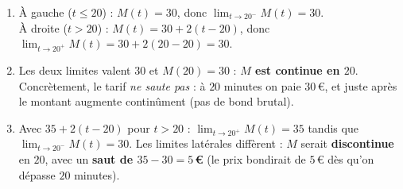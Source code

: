 \documentclass[11pt,a4paper]{article}
\begin{document}
\begin{correction}
\begin{enumerate}[label=\alph*),leftmargin=2em,itemsep=3pt]
  \item À gauche ($t\leq 20$) : $M(t)=30$, donc $\displaystyle\lim_{t\to 20^{-}} M(t)=30$.\\
        À droite ($t>20$) : $M(t)=30+2(t-20)$, donc $\displaystyle\lim_{t\to 20^{+}} M(t)=30+2(20-20)=30$.
  \item Les deux limites valent $30$ et $M(20)=30$ : \textbf{$M$ est continue en $20$}. Concrètement, le tarif
        \emph{ne saute pas} : à $20$ minutes on paie $30$\,€, et juste après le montant augmente
        continûment (pas de bond brutal).
  \item Avec $35+2(t-20)$ pour $t>20$ : $\displaystyle\lim_{t\to 20^{+}} M(t)=35$ tandis que
        $\displaystyle\lim_{t\to 20^{-}} M(t)=30$. Les limites latérales diffèrent : $M$ serait
        \textbf{discontinue} en $20$, avec un \textbf{saut de $35-30=5$\,€} (le prix bondirait de $5$\,€
        dès qu'on dépasse $20$ minutes).
\end{enumerate}
\end{correction}
\end{document}

